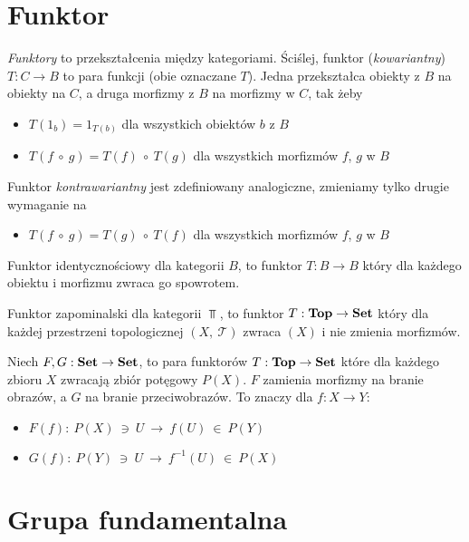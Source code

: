 \section{Funktor}


\emph{Funktory} to przekształcenia między kategoriami. Ściślej, funktor (\emph{kowariantny}) $T: C\to B$ to para funkcji (obie oznaczane $T$). Jedna przekształca obiekty z $B$ na obiekty na $C$, a druga morfizmy z $B$ na morfizmy w $C$, tak żeby
\begin{itemize}
\item $T(1_b) = 1_{T(b)}$ dla wszystkich obiektów $b$ z $B$
\item $T(f\  \circ\ g) = T(f)\ \circ\ T(g)$ dla wszystkich morfizmów $f$, $g$ w $B$
\end{itemize}
Funktor \emph{kontrawariantny} jest zdefiniowany analogiczne, zmieniamy tylko drugie wymaganie na
\begin{itemize}
	\item $T(f\  \circ\ g) = T(g)\ \circ\ T(f)$ dla wszystkich morfizmów $f$, $g$ w $B$
\end{itemize}

\begin{example}
	Funktor identycznościowy dla kategorii $B$, to funktor $T:B\to B$ który dla każdego obiektu i morfizmu zwraca go spowrotem.
\end{example}

\begin{example}
	Funktor zapominalski dla kategorii $\Top$, to funktor $T:\textbf{Top}\to \textbf{Set}$ który dla każdej przestrzeni topologicznej $(X,\  \mathcal T)$ zwraca  $(X)$ i nie zmienia morfizmów.
\end{example}

\begin{example}
	Niech $F, G: \textbf{Set} \to \textbf{Set}$, to para funktorów $T:\textbf{Top}\to \textbf{Set}$ które dla  każdego zbioru $X$ zwracają zbiór potęgowy $P(X)$. $F$ zamienia morfizmy  na branie obrazów, a $G$ na branie przeciwobrazów. To znaczy dla $f:X\to Y$:
	\begin{itemize}
		\item 	$F(f):\ P(X)\ \ni\ U\ \to\ f(U)\ \in\ P(Y)$
		\item 	$G(f):\ P(Y)\ \ni\ U\ \to\ f^{-1}(U)\ \in\ P(X)$
	\end{itemize}

\end{example}


\section{Grupa fundamentalna}